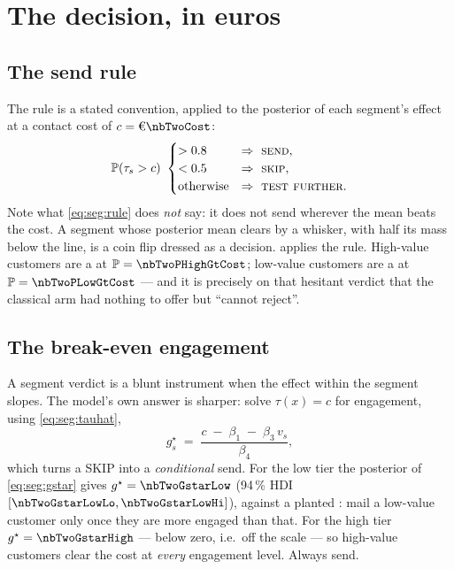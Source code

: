 \section{The decision, in euros}
\label{sec:seg:euro}

\subsection*{The send rule}

The rule is a stated convention, applied to the posterior of each segment's effect at a contact cost
of $c = \eur{\nbTwoCost}$:
%
\begin{equation}
  \operatorname{\mathbb{P}}(\tau_s > c)\ \begin{cases}
    > 0.8 & \Rightarrow\ \textsc{send},\\
    < 0.5 & \Rightarrow\ \textsc{skip},\\
    \text{otherwise} & \Rightarrow\ \textsc{test further}.
  \end{cases}
  \label{eq:seg:rule}
\end{equation}
%
Note what \cref{eq:seg:rule} does \emph{not} say: it does not send wherever the mean beats the cost.
A segment whose posterior mean clears \eur{\nbTwoCost} by a whisker, with half its mass below the
line, is a coin flip dressed as a decision.  applies the rule. High-value
customers are a \nbTwoActionHigh{} at $\Prob = \nbTwoPHighGtCost$; low-value customers are a
\nbTwoActionLow{} at $\Prob = \nbTwoPLowGtCost$ --- and it is precisely on that hesitant verdict that
the classical arm had nothing to offer but ``cannot reject''.



\subsection*{The break-even engagement}

A segment verdict is a blunt instrument when the effect within the segment slopes. The model's own
answer is sharper: solve $\tau(x) = c$ for engagement, using \cref{eq:seg:tauhat},
%
\begin{equation}
  g^{\star}_s \;=\; \frac{c \;-\; \beta_1 \;-\; \beta_3\, v_s}{\beta_4} ,
  \label{eq:seg:gstar}
\end{equation}
%
which turns a SKIP into a \emph{conditional} send. For the low tier the posterior of
\cref{eq:seg:gstar} gives $g^\star = \nbTwoGstarLow$ (94\,\% HDI
$[\nbTwoGstarLowLo, \nbTwoGstarLowHi]$), against a planted \nbTwoTrueGstar: mail a low-value customer
only once they are more engaged than that. For the high tier $g^\star = \nbTwoGstarHigh$ --- below
zero, i.e.\ off the scale --- so high-value customers clear the \eur{\nbTwoCost} cost at
\emph{every} engagement level. Always send.

